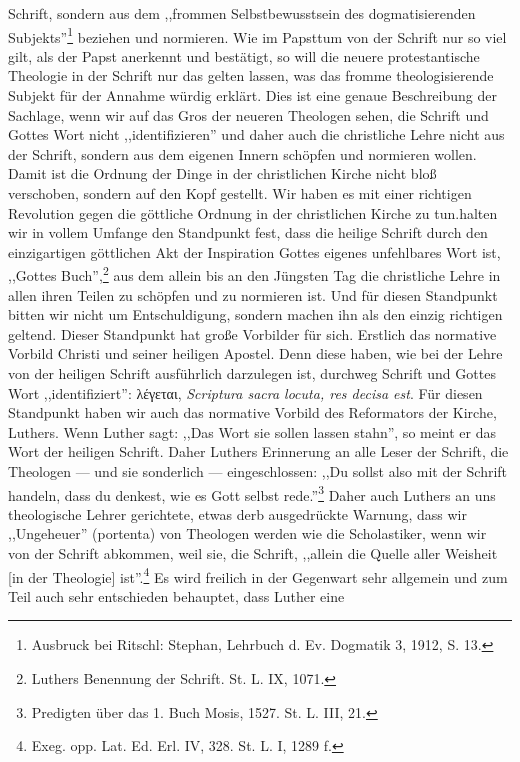 Schrift, sondern aus dem ,,frommen Selbstbewusstsein des dogmatisierenden Subjekts''\footnote{Ausbruck bei Ritschl: Stephan, Lehrbuch d. Ev. Dogmatik 3, 1912, S. 13.} beziehen und normieren. Wie im Papsttum von der Schrift nur so viel gilt, als der Papst anerkennt und bestätigt, so will die neuere protestantische Theologie in der Schrift nur das gelten lassen, was das fromme theologisierende Subjekt für der Annahme würdig erklärt. Dies ist eine genaue Beschreibung der Sachlage, wenn wir auf das Gros der neueren Theologen sehen, die Schrift und Gottes Wort nicht ,,identifizieren'' und daher auch die christliche Lehre nicht aus der Schrift, sondern aus dem eigenen Innern schöpfen und normieren wollen. Damit ist die Ordnung der Dinge in der christlichen Kirche nicht bloß verschoben, sondern auf den Kopf gestellt. Wir haben es mit einer richtigen Revolution gegen die göttliche Ordnung in der christlichen Kirche zu tun.\n{} halten wir in vollem Umfange den Standpunkt fest, dass die heilige Schrift durch den einzigartigen göttlichen Akt der Inspiration Gottes eigenes unfehlbares Wort ist, ,,Gottes Buch'',\footnote{Luthers Benennung der Schrift. St. L. IX, 1071.} aus dem allein bis an den Jüngsten Tag die christliche Lehre in allen ihren Teilen zu schöpfen und zu normieren ist. Und für diesen Standpunkt bitten wir nicht um Entschuldigung, sondern machen ihn als den einzig richtigen geltend. Dieser Standpunkt hat große Vorbilder für sich. Erstlich das normative Vorbild Christi und seiner heiligen Apostel. Denn diese haben, wie bei der Lehre von der heiligen Schrift ausführlich darzulegen ist, durchweg Schrift und Gottes Wort ,,identifiziert'': λέγεται, \emph{Scriptura sacra locuta, res decisa est}. Für diesen Standpunkt haben wir auch das normative Vorbild des Reformators der Kirche, Luthers. Wenn Luther sagt: ,,Das Wort sie sollen lassen stahn'', so meint er das Wort der heiligen Schrift. Daher Luthers Erinnerung an alle Leser der Schrift, die Theologen --- und sie sonderlich --- eingeschlossen: ,,Du sollst also mit der Schrift handeln, dass du denkest, wie es Gott selbst rede.''\footnote{Predigten über das 1. Buch Mosis, 1527. St. L. III, 21.} Daher auch Luthers an uns theologische Lehrer gerichtete, etwas derb ausgedrückte Warnung, dass wir ,,Ungeheuer'' (portenta) von Theologen werden wie die Scholastiker, wenn wir von der Schrift abkommen, weil sie, die Schrift, ,,allein die Quelle aller Weisheit [in der Theologie] ist''.\footnote{Exeg. opp. Lat. Ed. Erl. IV, 328. St. L. I, 1289 f.} Es wird freilich in der Gegenwart sehr allgemein und zum Teil auch sehr entschieden behauptet, dass Luther eine